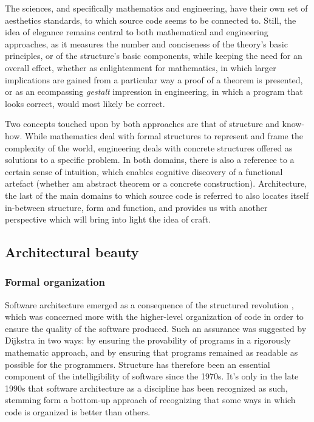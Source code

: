 The sciences, and specifically mathematics and engineering, have their own set of aesthetics standards, to which source code seems to be connected to. Still, the idea of elegance remains central to both mathematical and engineering approaches, as it measures the number and conciseness of the theory's basic principles, or of the structure's basic components, while keeping the need for an overall effect, whether as enlightenment for mathematics, in which larger implications are gained from a particular way a proof of a theorem is presented, or as an ecompassing \emph{gestalt} impression in engineering, in which a program that looks correct, would most likely be correct.

Two concepts touched upon by both approaches are that of structure and know-how. While mathematics deal with formal structures to represent and frame the complexity of the world, engineering deals with concrete structures offered as solutions to a specific problem. In both domains, there is also a reference to a certain sense of intuition, which enables cognitive discovery of a functional artefact (whether am abstract theorem or a concrete construction). Architecture, the last of the main domains to which source code is referred to also locates itself in-between structure, form and function, and provides us with another perspective which will bring into light the idea of craft.

\subsection{Architectural beauty}
\label{subsec:beauty-architecture}


\subsubsection{Formal organization}
\label{subsubsec:formal-organization}

Software architecture emerged as a consequence of the structured revolution \citep{dijkstra_chapter_1972}, which was concerned more with the higher-level organization of code in order to ensure the quality of the software produced. Such an assurance was suggested by Dijkstra in two ways: by ensuring the provability of programs in a rigorously mathematic approach, and by ensuring that programs remained as readable as possible for the programmers. Structure has therefore been an essential component of the intelligibility of software since the 1970s. It's only in the late 1990s that software architecture as a discipline has been recognized as such, stemming form a bottom-up approach of recognizing that some ways in which code is organized is better than others.

